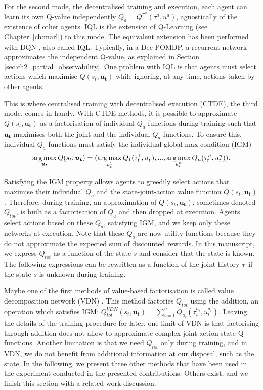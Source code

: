 For the second mode, the decentralised training and execution, each agent can learn its own Q-value independently $Q_a=Q^{\pi^a}(\tau^a, u^a)$, agnostically of the existence of other agents.
IQL \citep{Tan1993} is the extension of Q-Learning (see Chapter~\ref{ch:marl}) to this mode. 
The equivalent extension has been performed with DQN \citep{TampuuDqnIQL}, also called IQL.
Typically, in a Dec-POMDP, a recurrent network approximates the independent Q-value, as explained in Section \ref{sec:ch2_partial_observability}.
One problem with IQL is that agents must select actions which maximise $Q(s_t, \mathbf{u_t})$ while ignoring, at any time, actions taken by other agents.

This is where centralised training with decentralised execution (CTDE), the third mode, comes in handy.
With CTDE methods, it is possible to approximate $Q(s_t, \mathbf{u_t})$ as a factorisation of individual $Q_a$ functions during training such that $\mathbf{u_t}$ maximises both the joint and the individual $Q_a$ functions.
To ensure this, individual $Q_a$ functions must satisfy the individual-global-max condition (IGM) \citep{Son2019QTRAN:Learning}
\begin{equation}
    \argmax_{\mathbf{u_t}} Q(s_t, \mathbf{u_t}) =(\argmax_{u_t^{1}} Q_{1}(\tau_t^{1}, u_t^{1}),...,\argmax_{u_t^{n}} Q_{n}(\tau_t^{n}, u_t^{n})).
    \label{eq:ch3_igm}
\end{equation}

Satisfying the IGM property allows agents to greedily select actions that maximise their individual $Q_a$ and the state-joint-action value function $Q(s_t, \mathbf{u_t})$.
Therefore, during training, an approximation of $Q(s_t, \mathbf{u_t})$, sometimes denoted $Q_{tot}$, is built as a factorisation of $Q_a$ and then dropped at execution.
Agents select actions based on these $Q_a$, satisfying IGM, and we keep only these networks at execution.
Note that these $Q_a$ are now utility functions because they do not approximate the expected sum of discounted rewards.
In this manuscript, we express $Q_{tot}$ as a function of the state $s$ and consider that the state is known.
The following expressions can be rewritten as a function of the joint history $\mathbf{\tau}$ if the state $s$ is unknown during training.

Maybe one of the first methods of value-based factorisation is called value decomposition network (VDN) \citep{sunehag2018vdn}.
This method factories $Q_{tot}$ using the addition, an operation which satisfies IGM: $Q_{tot}^{VDN}(s_t, \mathbf{u_t}) = \sum_{i=1}^n Q_{a_i}(\tau^{a_i}_t, u^{a_i}_t)$.
Leaving the details of the training procedure for later, one limit of VDN is that factorising through addition does not allow to approximate complex joint-action-state Q functions.
Another limitation is that we need $Q_{tot}$ only during training, and in VDN, we do not benefit from additional information at our disposal, such as the state.
In the following, we present three other methods that have been used in the experiment conducted in the presented contributions.
Others exist, and we finish this section with a related work discussion.

